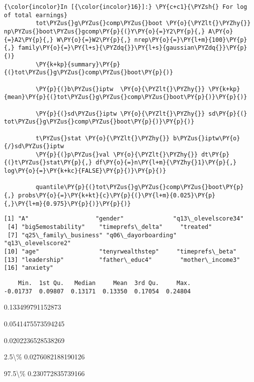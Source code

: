    \begin{Verbatim}[commandchars=\\\{\}]
{\color{incolor}In [{\color{incolor}16}]:} \PY{c+c1}{\PYZsh{} For log of total earnings}
         tot\PYZus{}g\PYZus{}comp\PYZus{}boot \PY{o}{\PYZlt{}\PYZhy{}} np\PYZus{}boot\PYZus{}gcomp\PY{p}{(}Y\PY{o}{=}Y2\PY{p}{,} A\PY{o}{=}A2\PY{p}{,} W\PY{o}{=}W2\PY{p}{,} nrep\PY{o}{=}\PY{l+m}{100}\PY{p}{,} family\PY{o}{=}\PY{l+s}{\PYZdq{}}\PY{l+s}{gaussian\PYZdq{}}\PY{p}{)} 
         \PY{k+kp}{summary}\PY{p}{(}tot\PYZus{}g\PYZus{}comp\PYZus{}boot\PY{p}{)}
         
         \PY{p}{(}b\PYZus{}iptw  \PY{o}{\PYZlt{}\PYZhy{}} \PY{k+kp}{mean}\PY{p}{(}tot\PYZus{}g\PYZus{}comp\PYZus{}boot\PY{p}{)}\PY{p}{)}
         
         \PY{p}{(}sd\PYZus{}iptw \PY{o}{\PYZlt{}\PYZhy{}} sd\PY{p}{(}  tot\PYZus{}g\PYZus{}comp\PYZus{}boot\PY{p}{)}\PY{p}{)}
         
         t\PYZus{}stat \PY{o}{\PYZlt{}\PYZhy{}} b\PYZus{}iptw\PY{o}{/}sd\PYZus{}iptw
         \PY{p}{(}p\PYZus{}val \PY{o}{\PYZlt{}\PYZhy{}} dt\PY{p}{(}t\PYZus{}stat\PY{p}{,} df\PY{o}{=}n\PY{l+m}{\PYZhy{}1}\PY{p}{,} log\PY{o}{=}\PY{k+kc}{FALSE}\PY{p}{)}\PY{p}{)}
         
         quantile\PY{p}{(}tot\PYZus{}g\PYZus{}comp\PYZus{}boot\PY{p}{,} probs\PY{o}{=}\PY{k+kt}{c}\PY{p}{(}\PY{l+m}{0.025}\PY{p}{,}\PY{l+m}{0.975}\PY{p}{)}\PY{p}{)}
\end{Verbatim}


    \begin{Verbatim}[commandchars=\\\{\}]
 [1] "A"                   "gender"              "q13\_olevelscore34"  
 [4] "big5emostability"    "timeprefs\_delta"     "treated"            
 [7] "q25\_family\_business" "q06\_dayorboarding"   "q13\_olevelscore2"   
[10] "age"                 "tenyrwealthstep"     "timeprefs\_beta"     
[13] "leadership"          "father\_educ4"        "mother\_income3"     
[16] "anxiety"            

    \end{Verbatim}

    
    \begin{verbatim}
    Min.  1st Qu.   Median     Mean  3rd Qu.     Max. 
-0.01737  0.09807  0.13171  0.13350  0.17054  0.24804 
    \end{verbatim}

    
    0.133499791152873

    
    0.0541475573594245

    
    0.0202236528538269

    
    \begin{description*}
\item[2.5\textbackslash{}\%] 0.0276082188190126
\item[97.5\textbackslash{}\%] 0.230772835739166
\end{description*}

